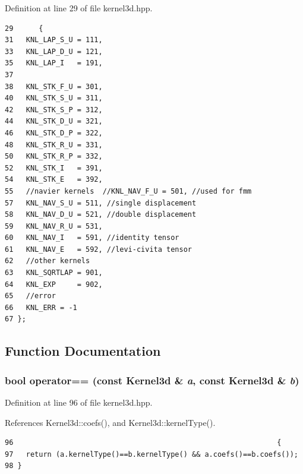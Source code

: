Definition at line 29 of file kernel3d.hpp.

\footnotesize\begin{verbatim}29      {
31   KNL_LAP_S_U = 111,
33   KNL_LAP_D_U = 121,
35   KNL_LAP_I   = 191, 
37 
38   KNL_STK_F_U = 301,
40   KNL_STK_S_U = 311,
42   KNL_STK_S_P = 312,
44   KNL_STK_D_U = 321,
46   KNL_STK_D_P = 322,
48   KNL_STK_R_U = 331,
50   KNL_STK_R_P = 332,
52   KNL_STK_I   = 391,
54   KNL_STK_E   = 392, 
55   //navier kernels  //KNL_NAV_F_U = 501, //used for fmm
57   KNL_NAV_S_U = 511, //single displacement
58   KNL_NAV_D_U = 521, //double displacement
59   KNL_NAV_R_U = 531,
60   KNL_NAV_I   = 591, //identity tensor
61   KNL_NAV_E   = 592, //levi-civita tensor
62   //other kernels
63   KNL_SQRTLAP = 901,
64   KNL_EXP     = 902,
65   //error
66   KNL_ERR = -1
67 };
\end{verbatim}\normalsize 




\subsection{Function Documentation}
\subsubsection{\setlength{\rightskip}{0pt plus 5cm}bool operator== (const {\bf Kernel3d} \& {\em a}, const {\bf Kernel3d} \& {\em b})\hspace{0.3cm}{\tt  [inline]}}\label{kernel3d_8hpp_f80bd09063fe1d69346216a570e88679_f80bd09063fe1d69346216a570e88679}




Definition at line 96 of file kernel3d.hpp.

References Kernel3d::coefs(), and Kernel3d::kernel\-Type().

\footnotesize\begin{verbatim}96                                                              {
97   return (a.kernelType()==b.kernelType() && a.coefs()==b.coefs());
98 }
\end{verbatim}\normalsize 


